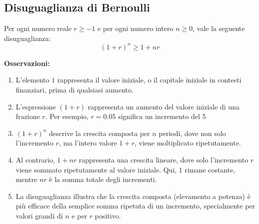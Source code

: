 \documentclass{book}
\begin{document}
\begin{theorem}
    \subsection{Disuguaglianza di Bernoulli}
    Per ogni numero reale \( r \geq -1 \) e per ogni numero intero \( n \geq 0 \), vale la seguente disuguaglianza:
    \[ (1 + r)^n \geq 1 + nr \]

    \textbf{Osservazioni:}
    \begin{enumerate}
        \item L'elemento \(1\) rappresenta il valore iniziale, o il capitale iniziale in contesti finanziari, prima di qualsiasi aumento.
        \item L'espressione \( (1 + r) \) rappresenta un aumento del valore iniziale di una frazione \( r \). Per esempio, \( r = 0.05 \) significa un incremento del 5%
        \item \( (1 + r)^n \) descrive la crescita composta per \( n \) periodi, dove non solo l'incremento \( r \), ma l'intero valore \( 1 + r \), viene moltiplicato ripetutamente.
        \item Al contrario, \( 1 + nr \) rappresenta una crescita lineare, dove solo l'incremento \( r \) viene sommato ripetutamente al valore iniziale. Qui, \( 1 \) rimane costante, mentre \( nr \) è la somma totale degli incrementi.
        \item La disuguaglianza illustra che la crescita composta (elevamento a potenza) è più efficace della semplice somma ripetuta di un incremento, specialmente per valori grandi di \( n \) e per \( r \) positivo.
    \end{enumerate}
\end{theorem}
\end{document}
